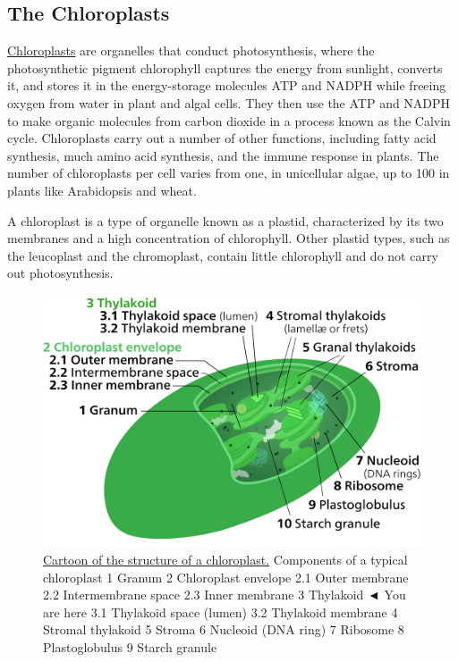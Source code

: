 \hypertarget{the-chloroplasts}{%
\subsection{The Chloroplasts}\label{the-chloroplasts}}

\href{https://en.wikipedia.org/wiki/Chloroplast}{Chloroplasts} are organelles that conduct photosynthesis, where the photosynthetic pigment chlorophyll captures the energy from sunlight, converts it, and stores it in the energy-storage molecules ATP and NADPH while freeing oxygen from water in plant and algal cells. They then use the ATP and NADPH to make organic molecules from carbon dioxide in a process known as the Calvin cycle. Chloroplasts carry out a number of other functions, including fatty acid synthesis, much amino acid synthesis, and the immune response in plants. The number of chloroplasts per cell varies from one, in unicellular algae, up to 100 in plants like Arabidopsis and wheat.

A chloroplast is a type of organelle known as a plastid, characterized by its two membranes and a high concentration of chlorophyll. Other plastid types, such as the leucoplast and the chromoplast, contain little chlorophyll and do not carry out photosynthesis.



\begin{figure}

{\centering \includegraphics[width=0.7\linewidth]{./figures/cells/Chloroplast_mini} 

}

\caption{\href{https://commons.wikimedia.org/wiki/File:Chloroplast_mini.svg}{Cartoon of the structure of a chloroplast.} Components of a typical chloroplast 1 Granum 2 Chloroplast envelope 2.1 Outer membrane 2.2 Intermembrane space 2.3 Inner membrane 3 Thylakoid ◄ You are here 3.1 Thylakoid space (lumen) 3.2 Thylakoid membrane 4 Stromal thylakoid 5 Stroma 6 Nucleoid (DNA ring) 7 Ribosome 8 Plastoglobulus 9 Starch granule}\label{fig:chloroplastcartoon}
\end{figure}


